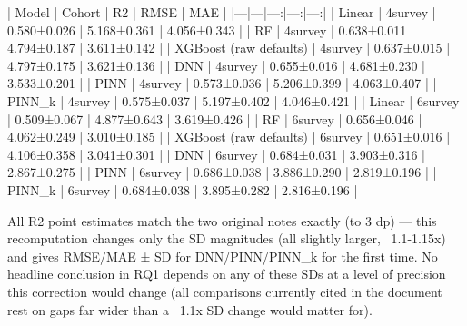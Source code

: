 | Model | Cohort | R2 | RMSE | MAE |
|---|---|---:|---:|---:|
| Linear | 4survey | 0.580±0.026 | 5.168±0.361 | 4.056±0.343 |
| RF | 4survey | 0.638±0.011 | 4.794±0.187 | 3.611±0.142 |
| XGBoost (raw defaults) | 4survey | 0.637±0.015 | 4.797±0.175 | 3.621±0.136 |
| DNN | 4survey | 0.655±0.016 | 4.681±0.230 | 3.533±0.201 |
| PINN | 4survey | 0.573±0.036 | 5.206±0.399 | 4.063±0.407 |
| PINN_k | 4survey | 0.575±0.037 | 5.197±0.402 | 4.046±0.421 |
| Linear | 6survey | 0.509±0.067 | 4.877±0.643 | 3.619±0.426 |
| RF | 6survey | 0.656±0.046 | 4.062±0.249 | 3.010±0.185 |
| XGBoost (raw defaults) | 6survey | 0.651±0.016 | 4.106±0.358 | 3.041±0.301 |
| DNN | 6survey | 0.684±0.031 | 3.903±0.316 | 2.867±0.275 |
| PINN | 6survey | 0.686±0.038 | 3.886±0.290 | 2.819±0.196 |
| PINN_k | 6survey | 0.684±0.038 | 3.895±0.282 | 2.816±0.196 |

All R2 point estimates match the two original notes exactly (to 3 dp) — this recomputation changes
only the SD magnitudes (all slightly larger, ~1.1-1.15x) and gives RMSE/MAE ± SD for DNN/PINN/PINN_k
for the first time. No headline conclusion in RQ1 depends on any of these SDs at a level of
precision this correction would change (all comparisons currently cited in the document rest on
gaps far wider than a ~1.1x SD change would matter for).

